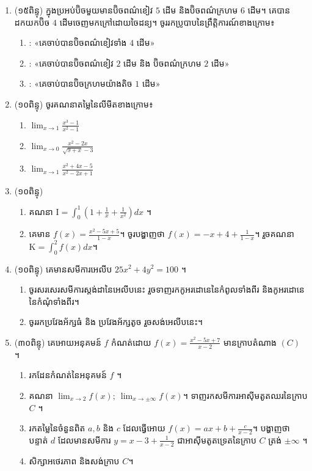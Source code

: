 \documentclass{officialexam}
\begin{document}
\newpage 
\maketitle 
\begin{enumerate}[I]
\item (១៥ពិន្ទុ) ក្នុងប្រអប់ប៊ិចមួយមានប៊ិចពណ៌ខៀវ $5$ ដើម និងប៊ិចពណ៌ក្រហម $6$ ដើម។ គេបានដកយកប៊ិច $4$ ដើមចេញមកក្រៅដោយចៃដន្យ។  ចូររកប្រូបាបនៃព្រឹត្តិការណ៍ខាងក្រោម៖
\begin{enumerate}[A]
\item : «គេចាប់បានប៊ិចពណ៌ខៀវទាំង $4$ ដើម»
\item : «គេចាប់បានប៊ិចពណ៌ខៀវ $2$ ដើម និង ប៊ិចពណ៌ក្រហម $2$ ដើម»
\item : «គេចាប់បានប៊ិចក្រហមយ៉ាងតិច $1$ ដើម»
\end{enumerate}
\item (១០ពិន្ទុ) ចូរគណនាតម្លៃនៃលីមីតខាងក្រោម៖
\begin{enumerate}[k,3]
\item $\lim_{x\to 1}\frac{x^3-1}{x^2-1}$ 
\item $\lim_{x\to 0}\frac{x^2-2x}{\sqrt{9+x}-3}$
\item $\lim_{x\to 1}\frac{x^2+4x-5}{x^2-2x+1}$
\end{enumerate}
\item (១០ពិន្ទុ) 
\begin{enumerate}[k]
\item គណនា $\mathrm{I}=\int_0^1\left(1+\frac{1}{x}+\frac{1}{x^2}\right)dx$ ។
\item គេមាន $f(x)=\frac{x^2-5x+5}{1-x}$។ ចូរបង្ហាញថា $f(x)=-x+4+\frac{1}{1-x}$។ រួចគណនា $\mathrm{K}=\int_0^2 f(x)dx$។
\end{enumerate}
\item (១០ពិន្ទុ) គេមានសមីការអេលីប $25x^2+4y^2=100$ ។
\begin{enumerate}[k]
\item ចូរសរសេរសមីការស្តង់ដានៃអេលីបនេះ រួចទាញរកកូអរដោនេនៃកំពូលទាំងពីរ និងកូអរដោនេនៃកំណុំទាំងពីរ។
\item ចូររកប្រវែងអ័ក្សធំ និង ប្រវែងអ័ក្សតូច រួចសង់អេលីបនេះ។
\end{enumerate}
\item (៣០ពិន្ទុ) គេអោយអនុគមន៍ $f$ កំណត់ដោយ $f(x)=\frac{x^2-5x+7}{x-2}$ មានក្រាបតំណាង $(C)$ ។
\begin{enumerate}[k]
\item រកដែនកំណត់នៃអនុគមន៍ $f$ ។ 
\item គណនា $\lim_{x\to 2}f(x);\ \lim_{x\to\pm\infty}f(x)$។ ទាញរកសមីការអាស៊ីមតូតឈរនៃក្រាប $C$ ។
\item រកតម្លៃនៃចំនួនពិត $a,b$ និង $c$ ដែលធ្វើអោយ $f(x)=ax+b+\frac{c}{x-2}$។ បង្ហាញថា បន្ទាត់ $d$ ដែលមានសមីការ $y=x-3+\frac{1}{x-2}$ ជាអាស៊ីមតូតទ្រេតនៃក្រាប $C$ ត្រង់ $\pm\infty$ ។
\item សិក្សាអថេរភាព និងសង់ក្រាប $C$។
\end{enumerate}
\end{enumerate}
\end{document}
